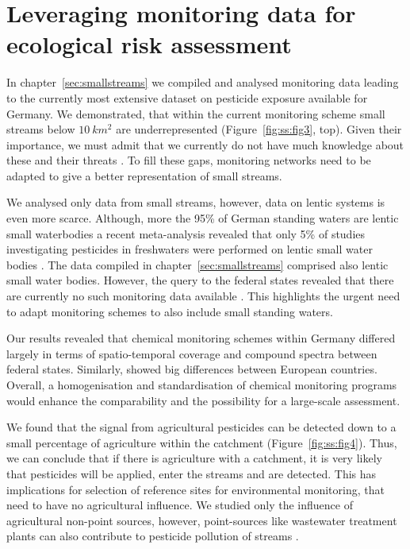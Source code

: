 \section{Leveraging monitoring data for ecological risk assessment}
In chapter~\ref{sec:smallstreams} we compiled and analysed monitoring data  leading to the currently most extensive dataset on pesticide exposure available for Germany. 
We demonstrated, that within the current monitoring scheme small streams below $10~km^2$ are underrepresented (Figure~\ref{fig:ss:fig3}, top).
Given their importance, we must admit that we currently do not have much knowledge about these and their threats \citep{biggs_importance_2016, lorenz_specifics_2016}. 
To fill these gaps, monitoring networks need to be adapted to give a better representation of small streams. 

We analysed only data from small streams, however, data on lentic systems is even more scarce. 
Although, more the 95\% of German standing waters are lentic small waterbodies a recent meta-analysis revealed that only 5\% of studies investigating pesticides in freshwaters were performed on lentic small water bodies \citet{lorenz_specifics_2016}.
The data compiled in chapter~\ref{sec:smallstreams} comprised also lentic small water bodies.
However, the query to the federal states revealed that there are currently no such monitoring data available \citep{brinke_umsetzung_2016}. 
This highlights the urgent need to adapt monitoring schemes to also include small standing waters.

Our results revealed that chemical monitoring schemes within Germany differed largely in terms of spatio-temporal coverage and compound spectra between federal states. 
Similarly, \citet{malaj_organic_2014} showed big differences between European countries.
Overall, a homogenisation and standardisation of chemical monitoring programs  would enhance the comparability and the possibility for a large-scale assessment.

We found that the signal from agricultural pesticides can be detected down to a small percentage of agriculture within the catchment (Figure~\ref{fig:ss:fig4}).
Thus, we can conclude that if there is agriculture with a catchment, it is very likely that pesticides will be applied, enter the streams and are detected.
This has implications for selection of reference sites for environmental monitoring, that need to have no agricultural influence.
We studied only the influence of agricultural non-point sources, however, point-sources like wastewater treatment plants can also contribute to pesticide pollution of streams \citep{bunzel_landscape_2014}.

